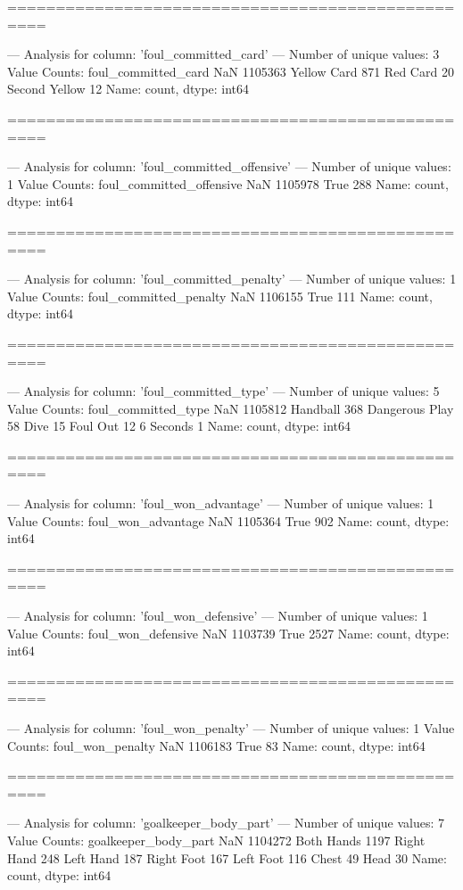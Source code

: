 ==================================================

--- Analysis for column: 'foul_committed_card' ---
Number of unique values: 3
Value Counts:
foul_committed_card
NaN              1105363
Yellow Card          871
Red Card              20
Second Yellow         12
Name: count, dtype: int64

==================================================

--- Analysis for column: 'foul_committed_offensive' ---
Number of unique values: 1
Value Counts:
foul_committed_offensive
NaN     1105978
True        288
Name: count, dtype: int64

==================================================

--- Analysis for column: 'foul_committed_penalty' ---
Number of unique values: 1
Value Counts:
foul_committed_penalty
NaN     1106155
True        111
Name: count, dtype: int64

==================================================

--- Analysis for column: 'foul_committed_type' ---
Number of unique values: 5
Value Counts:
foul_committed_type
NaN               1105812
Handball              368
Dangerous Play         58
Dive                   15
Foul Out               12
6 Seconds               1
Name: count, dtype: int64

==================================================

--- Analysis for column: 'foul_won_advantage' ---
Number of unique values: 1
Value Counts:
foul_won_advantage
NaN     1105364
True        902
Name: count, dtype: int64

==================================================

--- Analysis for column: 'foul_won_defensive' ---
Number of unique values: 1
Value Counts:
foul_won_defensive
NaN     1103739
True       2527
Name: count, dtype: int64

==================================================

--- Analysis for column: 'foul_won_penalty' ---
Number of unique values: 1
Value Counts:
foul_won_penalty
NaN     1106183
True         83
Name: count, dtype: int64

==================================================

--- Analysis for column: 'goalkeeper_body_part' ---
Number of unique values: 7
Value Counts:
goalkeeper_body_part
NaN           1104272
Both Hands       1197
Right Hand        248
Left Hand         187
Right Foot        167
Left Foot         116
Chest              49
Head               30
Name: count, dtype: int64

